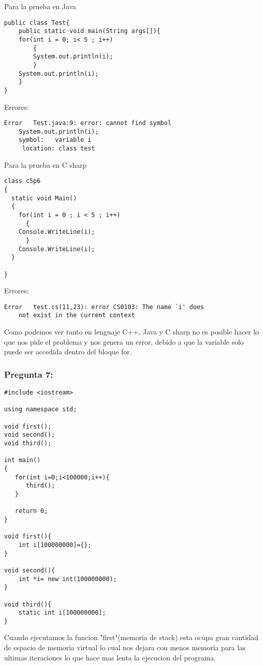\documentclass[11pt]{article}
\begin{document}
Para la prueba en Java
\begin{lstlisting}[frame=single]
public class Test{
    public static void main(String args[]){
	for(int i = 0; i< 5 ; i++)
	    {
		System.out.println(i);
	    }
	System.out.println(i);
    }
}
\end{lstlisting}
\noindent Errores:
\begin{verbatim}
Error	Test.java:9: error: cannot find symbol
	System.out.println(i);
	symbol:   variable i
	 location: class test
\end{verbatim}

Para la prueba en C sharp

\begin{lstlisting}[frame=single]
class c5p6
{
  static void Main()
  {
    for(int i = 0 ; i < 5 ; i++)
      {
	Console.WriteLine(i);
      }
    Console.WriteLine(i); 
  }

}
\end{lstlisting}
\noindent Errores:
\begin{verbatim}
Error	test.cs(11,23): error CS0103: The name `i' does 
	not exist in the current context
\end{verbatim}
Como podemos ver tanto en lenguaje C++, Java y C sharp no es posible hacer lo que nos pide el problema y nos genera un error, debido a que la variable solo puede ser accedida dentro del bloque for.

\subsubsection{Pregunta 7:}
\begin{lstlisting}[frame=single]
#include <iostream>

using namespace std;

void first();
void second();
void third();

int main()
{
   for(int i=0;i<100000;i++){
      third();
   }
   
   return 0;
}

void first(){
    int i[100000000]={};    
}

void second(){
    int *i= new int(100000000);
}

void third(){
    static int i[100000000];
}
\end{lstlisting}

Cuando ejecutamos la funcion "first"(memoria de stack) esta ocupa gran cantidad de espacio de memoria virtual lo cual nos dejara con menos memoria para las ultimas iteraciones lo que hace mas lenta la ejecucion del programa.
\end{document}
